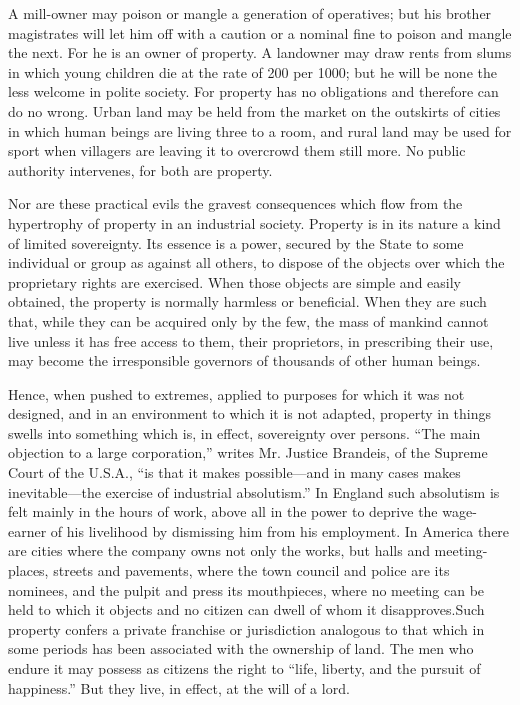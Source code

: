 \documentclass{book}
\begin{document}
A mill-owner may poison or mangle a generation of operatives; but his brother magistrates will let him off with a caution or a nominal fine to poison and mangle the next. For he is an owner of property. A landowner may draw rents from slums in which young children die at the rate of 200 per 1000; but he will be none the less welcome in polite society. For property has no obligations and therefore can do no wrong. Urban land may be held from the market on the outskirts of cities in which human beings are living three to a room, and rural land may be used for sport when villagers are leaving it to overcrowd them still more. No public authority intervenes, for both are property.

Nor are these practical evils the gravest consequences which flow from the hypertrophy of property in an industrial society. Property is in its nature a kind of limited sovereignty. Its essence is a power, secured by the State to some individual or group as against all others, to dispose of the objects over which the proprietary rights are exercised. When those objects are simple and easily obtained, the property is normally harmless or beneficial. When they are such that, while they can be acquired only by the few, the mass of mankind cannot live unless it has free access to them, their proprietors, in prescribing their use, may become the irresponsible governors of thousands of other human beings.

Hence, when pushed to extremes, applied to purposes for which it was not designed, and in an environment to which it is not adapted, property in things swells into something which is, in effect, sovereignty over persons. “The main objection to a large corporation,” writes Mr. Justice Brandeis, of the Supreme Court of the U.S.A., “is that it makes possible—and in many cases makes inevitable—the exercise of industrial absolutism.” In England such absolutism is felt mainly in the hours of work, above all in the power to deprive the wage-earner of his livelihood by dismissing him from his employment. In America there are cities where the company owns not only the works, but halls and meeting-places, streets and pavements, where the town council and police are its nominees, and the pulpit and press its mouthpieces, where no meeting can be held to which it objects and no citizen can dwell of whom it disapproves.\footnotemark[5] Such property confers a private franchise or jurisdiction analogous to that which in some periods has been associated with the ownership of land. The men who endure it may possess as citizens the right to “life, liberty, and the pursuit of happiness.” But they live, in effect, at the will of a lord.
\end{document}
